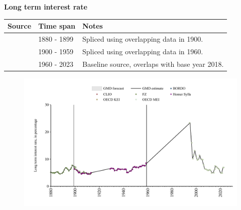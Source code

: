 \documentclass[12pt,a4paper,landscape]{article}
\begin{document}
\begin{adjustbox}{max totalsize={\paperwidth}{\paperheight},center}
\begin{minipage}[t][\textheight][t]{\textwidth}
\vspace*{0.5cm}
{}
\begin{center}
{\Large\bfseries Long term interest rate}
\end{center}
\vspace{0.5cm}
\begin{table}[H]
\centering
\small
\begin{tabular}{|l|l|l|}
\hline
\textbf{Source} & \textbf{Time span} & \textbf{Notes} \\
\hline
\rowcolor{white}\cite{FZ}& 1880 - 1899 &Spliced using overlapping data in 1900. \\
\rowcolor{lightgray}\cite{BORDO}& 1900 - 1959 &Spliced using overlapping data in 1960. \\
\rowcolor{white}\cite{OECD_MEI}& 1960 - 2023 &Baseline source, overlaps with base year 2018. \\
\hline
\end{tabular}
\end{table}
\begin{figure}[H]
\centering
\includegraphics[width=\textwidth,height=0.6\textheight,keepaspectratio]{graphs/BRA_ltrate.pdf}
\end{figure}
\end{minipage}
\end{adjustbox}
\end{document}
